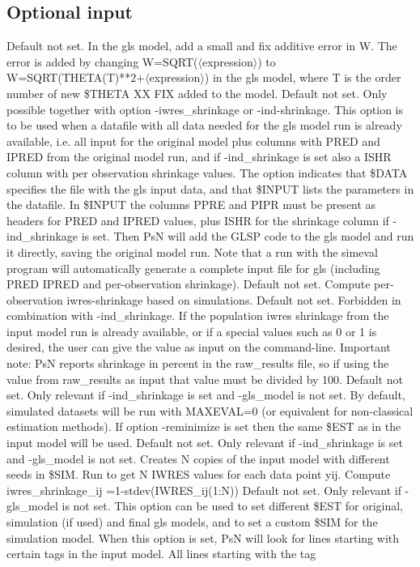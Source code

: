 \subsection{Optional input}

\begin{optionlist}
Default not set. In the gls model, add a small and fix additive error in W. 
The error is added by changing W=SQRT($\langle$expression$\rangle$) to W=SQRT(THETA(T)**2+$\langle$expression$\rangle$) in the 
gls model, where T is the order number of new \$THETA XX FIX added to the model. 
\nextopt
{}
Default not set. Only possible together with option -iwres\_shrinkage or -ind-shrinkage. This option is to be used when a datafile with all
data needed for the gls model run is already available, i.e. all input for the original model plus columns with PRED and IPRED from the 
original model run, and if -ind\_shrinkage is set also a ISHR column with per observation shrinkage values. The option indicates that \$DATA 
specifies the file with the gls input data, and that \$INPUT lists the parameters in the datafile. In \$INPUT the columns PPRE and PIPR must 
be present as headers for PRED and IPRED values, plus ISHR for the shrinkage column if -ind\_shrinkage is set. 
Then PsN will add the GLSP code to the gls model and run it directly, saving the original model run.
Note that a run with the simeval program will automatically generate a complete input file for gls (including PRED IPRED and per-observation 
shrinkage).
\nextopt
{}
Default not set. Compute per-observation iwres-shrinkage based on simulations. 
\nextopt
{}
Default not set. Forbidden in combination with -ind\_shrinkage. If the population iwres shrinkage from the input model run is already available, 
or if a special values such as 0 or 1 is desired, the user can give the value as input on the command-line. Important note: PsN reports shrinkage
in percent in the raw\_results file, so if using the value from raw\_results as input that value must be divided by 100.   
\nextopt
{}
Default not set. Only relevant if -ind\_shrinkage is set and -gls\_model is not set. By default, simulated datasets will be run with MAXEVAL=0 
(or equivalent for non-classical estimation methods). If option -reminimize is set then the same \$EST as in the input model will be used. 
\nextopt
{}
Default not set. Only relevant if -ind\_shrinkage is set and -gls\_model is not set. Creates N copies of the input model with different seeds in \$SIM. 
Run to get N IWRES values for each data point yij. 
Compute iwres\_shrinkage\_ij =1-stdev(IWRES\_ij(1:N))
\nextopt
{}
Default not set. Only relevant if -gls\_model is not set. This option can be used to set different \$EST for original, simulation (if used) and final gls 
models, and to set a custom \$SIM for the simulation model. When this option is set, PsN will look for lines starting with certain tags in the input model. 
All lines starting with the tag


\end{optionlist}
